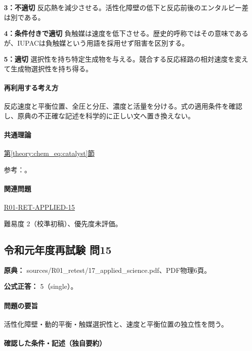 \noindent\textbf{3：不適切} 反応熱を減少させる。活性化障壁の低下と反応前後のエンタルピー差は別である。\par

\noindent\textbf{4：条件付きで適切} 負触媒は速度を低下させる。歴史的呼称ではその意味であるが、IUPACは負触媒という用語を採用せず阻害を区別する。\par

\noindent\textbf{5：適切} 選択性を持ち特定生成物を与える。競合する反応経路の相対速度を変えて生成物選択性を持ち得る。\par

\paragraph{再利用する考え方} 反応速度と平衡位置、全圧と分圧、濃度と活量を分ける。式の適用条件を確認し、原典の不正確な記述を科学的に正しい文へ置き換えない。

\paragraph{共通理論} \hyperref[theory:chem_eq:catalyst]{第\ref*{theory:chem_eq:catalyst}節}

\par 参考：\cite{iupac_greenbook2012,iupac_catalyst}。

\paragraph{関連問題} \hyperref[q:r01-ret-applied-15]{R01-RET-APPLIED-15}

\par 難易度 2（校準初稿）、優先度未評価。

\subsection{令和元年度再試験 問15}
\label{q:r01-ret-applied-15}

\noindent\textbf{原典：} sources/R01\_retest/17\_applied\_science.pdf、PDF物理6頁。

\textbf{公式正答：} 5（single）。

\paragraph{問題の要旨} 活性化障壁・動的平衡・触媒選択性と、速度と平衡位置の独立性を問う。

\paragraph{確認した条件・記述（独自要約）}\mbox{}\par

